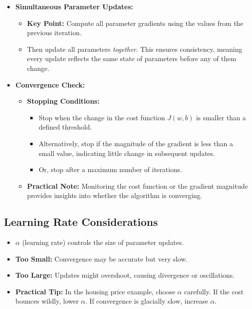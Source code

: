 \documentclass{article}
\begin{document}
\begin{itemize}
    \item \textbf{Simultaneous Parameter Updates:}
    \begin{itemize}[label=\(\bullet\)]
        \item \textbf{Key Point:} Compute all parameter gradients using the values from the previous iteration.
        \item Then update all parameters \emph{together}. This ensures consistency, meaning every update reflects the same state of parameters before any of them change.
    \end{itemize}

    \item \textbf{Convergence Check:}
    \begin{itemize}[label=\(\bullet\)]
        \item \textbf{Stopping Conditions:}
        \begin{itemize}[label=\(\bullet\)]
            \item Stop when the change in the cost function \(J(w,b)\) is smaller than a defined threshold.
            \item Alternatively, stop if the magnitude of the gradient is less than a small value, indicating little change in subsequent updates.
            \item Or, stop after a maximum number of iterations.
        \end{itemize}
        \item \textbf{Practical Note:} Monitoring the cost function or the gradient magnitude provides insights into whether the algorithm is converging.
    \end{itemize}
\end{itemize}

\subsection{Learning Rate Considerations}

\begin{itemize}
    \item \(\alpha\) (learning rate) controls the size of parameter updates.
    \item \textbf{Too Small:} Convergence may be accurate but very slow.
    \item \textbf{Too Large:} Updates might overshoot, causing divergence or oscillations.
    \item \textbf{Practical Tip:} In the housing price example, choose \(\alpha\) carefully. If the cost bounces wildly, lower \(\alpha\). If convergence is glacially slow, increase \(\alpha\).
\end{itemize}
\end{document}
